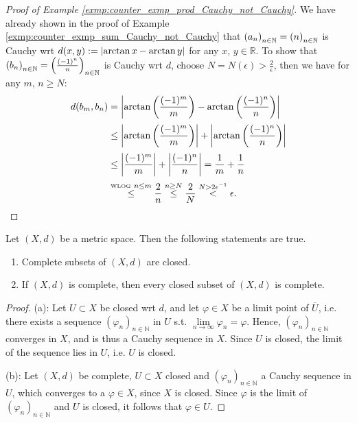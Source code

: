 \begin{proof}[Proof of Example \ref{exmp:counter_exmp_prod_Cauchy_not_Cauchy}]
	We have already shown in the proof of Example \ref{exmp:counter_exmp_sum_Cauchy_not_Cauchy} that $\seq[a_n] = \seq[n]$ is Cauchy wrt $d(x, y) := \abs{\arctan x - \arctan y}$ for any $x$, $y\in\mathbb R$. To show that $\seq[b_n] = \seq[\frac{(-1)^n}{n}]$ is Cauchy wrt $d$, choose $N = N(\epsilon) > \frac{2}{\epsilon}$, then we have for any $m$, $n\geq N$:
	\begin{align*}
		d(b_m, b_n) &= \abs{\arctan\left(\frac{(-1)^m}{m}\right) - \arctan \left(\frac{(-1)^n}{n}\right)} 
		\\[2pt] &\leq \abs{\arctan\left(\frac{(-1)^m}{m}\right)} + \abs{\arctan\left(\frac{(-1)^n}{n}\right)} 
		\\[2pt] &\leq \abs{\frac{(-1)^m}{m}} + \abs{\frac{(-1)^n}{n}} = \frac{1}{m} + \frac{1}{n} \\[2pt] &\overset{\text{\tiny WLOG}\ n \leq m}{\leq} \frac{2}{n} \overset{n \geq N}{\leq} \frac{2}{N} \overset{N > 2\epsilon^{-1}}{<} \epsilon.
	\end{align*}
\end{proof} 

\begin{theorem}\label{thrm:complete_subsets_properties}
	Let $(X, d)$ be a metric space. Then the following statements are true.
	\begin{enumerate}[label=(\alph*)]
		\item Complete subsets of $(X, d)$ are closed. \vspace{-0.3cm}
		\item If $(X, d)$ is complete, then every closed subset of $(X, d)$ is complete.
	\end{enumerate}
\end{theorem}

\begin{proof}
	(a): Let $U\subset X$ be closed wrt $d$, and let $\varphi\in X$ be a limit point of $\overline{U}$, i.e. there exists a sequence $\left(\varphi_{n}\right)_{n\in\mathbb N}$ in $U$ s.t. $\lim\limits_{n\to\infty}\varphi_n = \varphi$. Hence, $\left(\varphi_{n}\right)_{n\in\mathbb N}$ converges in $X$, and is thus a Cauchy sequence in $X$. Since $U$ is closed, the limit of the sequence lies in $U$, i.e. $U$ is closed.
	
	(b): Let $(X, d)$ be complete, $U\subset X$ closed and $(\varphi_n)_{n\in\mathbb N}$ a Cauchy sequence in $U$, which converges to a $\varphi\in X$, since $X$ is closed. Since $\varphi$ is the limit of $(\varphi_n)_{n\in\mathbb N}$ and $U$ is closed, it follows that $\varphi\in U$.
\end{proof}

